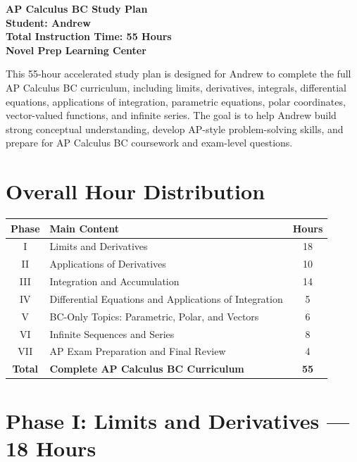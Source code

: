 \documentclass[11pt]{article}
\begin{document}
\begin{center}
{\Huge \textbf{\color{NovelPurple}AP Calculus BC Study Plan}}\\[6pt]
{\Large \textbf{Student: Andrew}}\\[4pt]
{\large \textbf{Total Instruction Time: 55 Hours}}\\[6pt]
\textbf{Novel Prep Learning Center}
\end{center}

\vspace{0.15in}

\begin{tcolorbox}[colback=LightPurple, colframe=NovelPurple, title=\textbf{Program Goal}]
This 55-hour accelerated study plan is designed for Andrew to complete the full AP Calculus BC curriculum, including limits, derivatives, integrals, differential equations, applications of integration, parametric equations, polar coordinates, vector-valued functions, and infinite series. The goal is to help Andrew build strong conceptual understanding, develop AP-style problem-solving skills, and prepare for AP Calculus BC coursework and exam-level questions.
\end{tcolorbox}

\section*{Overall Hour Distribution}

\begin{tabularx}{\textwidth}{|c|X|c|}
\hline
\rowcolor{LightPurple}
\textbf{Phase} & \textbf{Main Content} & \textbf{Hours} \\
\hline
I & Limits and Derivatives & 18 \\
\hline
II & Applications of Derivatives & 10 \\
\hline
III & Integration and Accumulation & 14 \\
\hline
IV & Differential Equations and Applications of Integration & 5 \\
\hline
V & BC-Only Topics: Parametric, Polar, and Vectors & 6 \\
\hline
VI & Infinite Sequences and Series & 8 \\
\hline
VII & AP Exam Preparation and Final Review & 4 \\
\hline
\textbf{Total} & \textbf{Complete AP Calculus BC Curriculum} & \textbf{55} \\
\hline
\end{tabularx}

\section*{Phase I: Limits and Derivatives --- 18 Hours}
\end{document}
